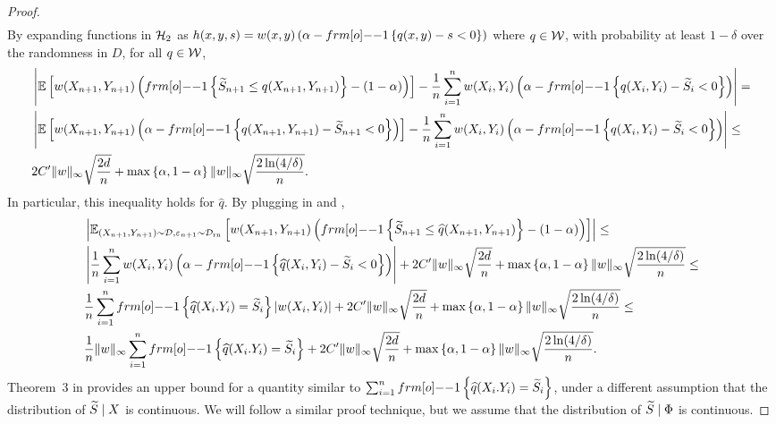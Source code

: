 \begin{proof}
\begin{align*}
\end{align*}
By expanding functions in ${\cal H}_2$ as $h(x,y,s) = w(x,y)\pth{\alpha - \11\sth{q(x,y)-s < 0}}$ where $q\in{\cal W}$, with probability at least $1-\delta$ over the randomness in $D$, for all $q\in{\cal W}$, 
\begin{align*}
    &\left| \EE \qth{w(X_{n+1},Y_{n+1}) \pth{\11\sth{\tS_{n+1}\leq q(X_{n+1},Y_{n+1}) } - (1-\alpha) }} - \frac{1}{n} \sum_{i=1}^n w(X_i,Y_i) \pth{\alpha - \11\sth{q(X_i,Y_i)- \tS_i < 0}} \right| = \\ 
    &\left| \EE \qth{w(X_{n+1},Y_{n+1}) \pth{\alpha - \11\sth{q(X_{n+1},Y_{n+1}) - \tS_{n+1} < 0}  }} - \frac{1}{n} \sum_{i=1}^n w(X_i,Y_i) \pth{\alpha - \11\sth{q(X_i,Y_i)- \tS_i < 0}} \right| \leq \\
    &2C'\|w\|_\infty \sqrt {\frac{2d}{n}} + \max\sth{\alpha, 1-\alpha} \|w\|_\infty  \sqrt{\frac{2 \ln(4/\delta)}{n}}.
\end{align*}
In particular, this inequality holds for $\hat q$. By plugging in  and ,
\begin{align}
\label{eq:thm_jointcondcov_app3}
\begin{split}
     &\left| \EE_{(X_{n+1},Y_{n+1}) \sim\calD, \varepsilon_{n+1} \sim \calD_{\text{rn}}} \qth{w(X_{n+1},Y_{n+1}) \pth{\11\sth{\tS_{n+1} \leq 
    \hat q(X_{n+1},Y_{n+1}) } - (1-\alpha) }} \right| \leq \\
    &\left| \frac{1}{n} \sum_{i=1}^n w(X_i,Y_i) \pth{\alpha - \11\sth{\hat q(X_i,Y_i)- \tS_i < 0}} \right| + 2C'\|w\|_\infty \sqrt {\frac{2d}{n}} + \max\sth{\alpha, 1-\alpha} \|w\|_\infty  \sqrt{\frac{2 \ln(4/\delta)}{n}} \leq \\
    &\frac{1}{n} \sum_{i=1}^n \11 \sth{\hat q(X_i.Y_i)=\tS_i} |w(X_i,Y_i) | + 2C'\|w\|_\infty \sqrt {\frac{2d}{n}} + \max\sth{\alpha, 1-\alpha} \|w\|_\infty  \sqrt{\frac{2 \ln(4/\delta)}{n}} \leq \\
    &\frac{1}{n}\|w\|_\infty \sum_{i=1}^n \11 \sth{\hat q(X_i.Y_i)=\tS_i} + 2C'\|w\|_\infty \sqrt {\frac{2d}{n}} + \max\sth{\alpha, 1-\alpha} \|w\|_\infty  \sqrt{\frac{2 \ln(4/\delta)}{n}}.
\end{split}
\end{align}
Theorem~3 in \citet{GCC2023} provides an upper bound for a quantity similar to $\sum_{i=1}^n \11 \sth{\hat q(X_i.Y_i)=\tS_i}$, under a different assumption that the distribution of ${\widetilde{S}} \mid X$ is continuous. We will follow a similar proof technique, but we assume that the distribution of ${\widetilde{S}} \mid \Phi$ is continuous.


\end{proof}
